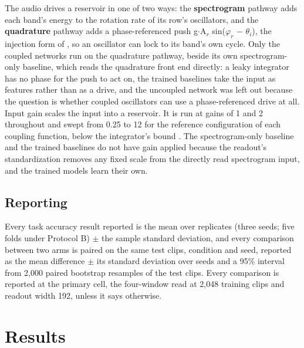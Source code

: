 \documentclass{article}
\makeatletter
\newcommand{\iclr@floatbarrier}{\par\vspace{\z@}%
  \ifx\@deferlist\@empty\else\clearpage\fi}
\let\iclr@section\section
\renewcommand{\section}{\iclr@floatbarrier\iclr@section}
\makeatother
\begin{document}
The audio drives a reservoir in one of two ways: the
\textbf{spectrogram} pathway adds each band's energy to the rotation
rate of its row's oscillators, and the \textbf{quadrature} pathway adds
a phase-referenced push g\ensuremath{\cdot}A\ensuremath{_{r}}
sin(\ensuremath{\varphi_{r}} \ensuremath{-} \ensuremath{\theta_{i}}),
the injection form of \citet{adler1946}, so an oscillator can lock to
its band's own cycle. Only the coupled networks run on the quadrature
pathway, beside its own spectrogram-only baseline, which reads the
quadrature front end directly: a leaky integrator has no phase for the
push to act on, the trained baselines take the input as features rather
than as a drive, and the uncoupled network was left out because the
question is whether coupled oscillators can use a phase-referenced drive
at all. Input gain scales the input into a reservoir. It is run at gains
of 1 and 2 throughout and swept from 0.25 to 12 for the reference
configuration of each coupling function, below the integrator's bound
\citep{hairer1993}. The spectrogram-only baseline and the trained
baselines do not have gain applied because the readout's standardization
removes any fixed scale from the directly read spectrogram input, and
the trained models learn their own.

\subsection{Reporting}\label{sec-3-5}

Every task accuracy result reported is the mean over replicates (three
seeds; five folds under Protocol B) \ensuremath{\pm} the sample standard
deviation, and every comparison between two arms is paired on the same
test clips, condition and seed, reported as the mean difference
\ensuremath{\pm} its standard deviation over seeds and a 95\% interval
from 2,000 paired bootstrap resamples of the test clips. Every
comparison is reported at the primary cell, the four-window read at
2,048 training clips and readout width 192, unless it says otherwise.

\section{Results}\label{sec-4}
\end{document}
